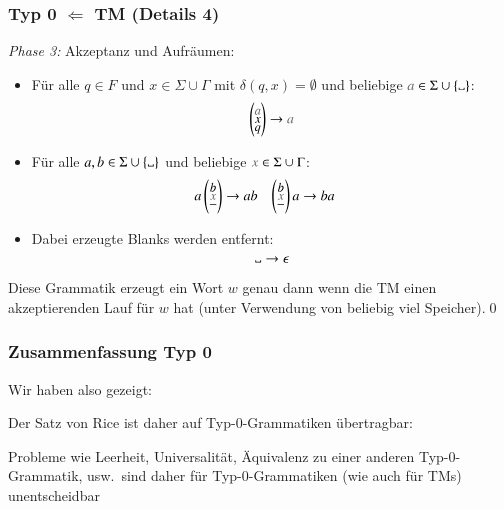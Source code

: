 \documentclass[onlymath]{beamer}
\begin{document}
\begin{frame}\frametitle{Typ 0 $\Leftarrow$ TM (Details 4)}

\emph{Phase 3:} Akzeptanz und Aufräumen:

\begin{itemize}
\item Für alle $q\in F$ und $x\in\Sigma\cup\Gamma$ mit $\delta(q,x)=\emptyset$ und beliebige $\unemph{a}\in\Sigma\cup\{\blank\}$:\vspace{-0.5ex}
\[ \vtriple{\unemph{a}}{x}{q} \to \unemph{a} \]\vspace{-1.5ex}\pause
%
\item Für alle $a,b\in\Sigma\cup\{\blank\}$ und beliebige $\unemph{x}\in\Sigma\cup\Gamma$:
\begin{align*}
a\vtriple{b}{\unemph{x}}{-} &\to ab &
\vtriple{b}{\unemph{x}}{-}a &\to ba
\end{align*}\vspace{-1.5ex}\pause%
%
\item Dabei erzeugte Blanks werden entfernt:\vspace{-0.5ex}
\[\blank \to \epsilon\]\vspace{-3.5ex}
\end{itemize}\pause

Diese Grammatik erzeugt ein Wort $w$ genau dann wenn die TM einen akzeptierenden Lauf für $w$ hat (unter Verwendung von 
beliebig viel Speicher).\qed\bigskip

\end{frame}

\begin{frame}\frametitle{Zusammenfassung Typ 0}

Wir haben also gezeigt:\medskip

\medskip

Der Satz von Rice ist daher auf Typ-0-Grammatiken übertragbar:


Probleme wie Leerheit, Universalität, Äquivalenz zu einer anderen Typ-0-Grammatik, usw.\ sind daher für Typ-0-Grammatiken (wie auch für TMs) unentscheidbar

\end{frame}
\end{document}
